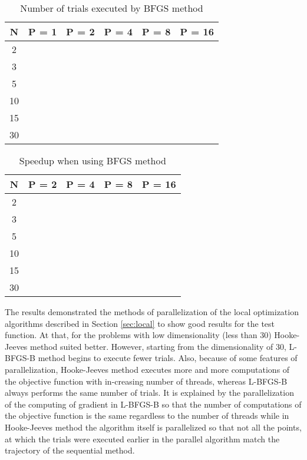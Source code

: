 \documentclass[runningheads]{llncs}
\begin{document}
\begin{table}[ht]
	\caption{Number of trials executed by BFGS method}
	\label{tab:3}
	\center
	\begin{tabular}{|c|c|c|c|c|c|}
		\hline
		N & P = 1 & P = 2 & P = 4 & P = 8 & P = 16 \\
		\hline 
		2 &	 &  &  &  &   \\
		\hline
		3 &	 &  &  &  &   \\
		\hline
		5 &	 &  &  &  &   \\
		\hline
		10 &  &  &  &  &   \\
		\hline
		15 &  &  &  &  &   \\
		\hline
		30 &  &  &  &  &   \\
		\hline
	\end{tabular}
\end{table}

\begin{table}[ht]
	\caption{Speedup when using BFGS method}
	\label{tab:4}
	\center
	\begin{tabular}{|c|c|c|c|c|}
		\hline
		N & P = 2 & P = 4 & P = 8 & P = 16 \\
		\hline 
		2 &  &  &  &   \\
		\hline
		3 &  &  &  &   \\
		\hline
		5 &  &  &  &   \\
		\hline
		10 &  &  &  &   \\
		\hline
		15 &  &  &  &   \\
		\hline
		30 &  &  &  &   \\
		\hline
	\end{tabular}
\end{table}

The results demonstrated the methods of parallelization of the local optimization algorithms described in Section \ref{sec:local} to show good results for the test function. At that, for the problems with low dimensionality (less than 30) Hooke-Jeeves method suited better. However, starting from the dimensionality of 30, L-BFGS-B method begins to execute fewer trials. Also, because of some features of parallelization, Hooke-Jeeves method executes more and more computations of the objective function with in-creasing number of threads, whereas L-BFGS-B always performs the same number of trials. It is explained by the parallelization of the computing of gradient in L-BFGS-B so that the number of computations of the objective function is the same regardless to the number of threads while in Hooke-Jeeves method the algorithm itself is parallelized so that not all the points, at which the trials were executed earlier in the parallel algorithm match the trajectory of the sequential method.
\end{document}
